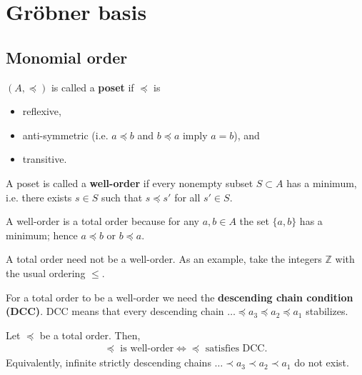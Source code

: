 \documentclass[a4paper, 11pt]{article}
\begin{document}
\maketitle
\tableofcontents

\clearpage

\section{Gröbner basis}

\subsection{Monomial order}


\begin{defi}[Poset]
  \( (A, \preceq) \) is called a {\textbf{poset}} if \( \preceq \) is 
  \begin{itemize}
    \item reflexive,
    \item anti-symmetric  (i.e. \( a \preceq b \) and \( b \preceq a \) imply \( a = b \)), and 
    \item transitive.
  \end{itemize}
\end{defi}

\begin{defi}
  A poset is called a \textbf{well-order} if every nonempty subset \( S \subset A \) has a minimum, i.e. there exists \( s \in S \) such that \( s \preceq s'  \) for all \( s' \in S \).
\end{defi}

\begin{remark}
  A well-order is a total order because for any \( a,b \in A \) the set \( \{ a,b \} \) has a minimum; hence \( a \preceq b \) or \( b \preceq a \).

  A total order need not be a well-order. As an example, take the integers \( \mathbb Z \) with the usual ordering \( \leq \).
\end{remark}

For a total order to be a well-order we need the \textbf{descending chain condition (DCC)}. DCC means that every descending chain \( \dots \preceq a_3 \preceq a_2 \preceq a_1 \) stabilizes.

\begin{prop}[total order + DCC = well-order]
  Let \( \preceq \) be a total order. Then, 
  \begin{align*}
    \preceq \text{ is well-order} \iff \preceq \text{ satisfies DCC}.
  \end{align*}
  Equivalently, infinite strictly descending chains \( \dots \prec a_3 \prec a_2 \prec a_1  \) do not exist.
\end{prop}
\end{document}
